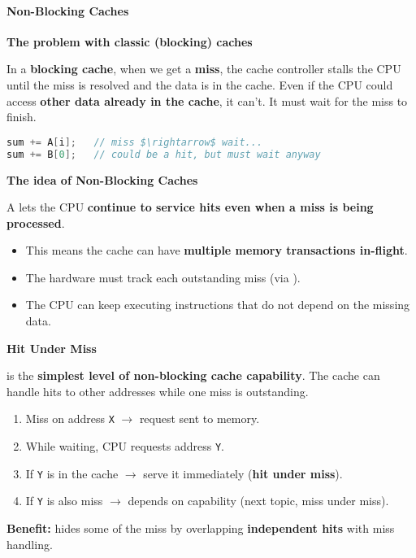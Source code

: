\paragraph{Non-Blocking Caches}\label{paragraph: Non-Blocking Caches}

\begin{flushleft}
    \textcolor{Red2}{ \textbf{The problem with classic (blocking) caches}}
\end{flushleft}
In a \textbf{blocking cache}, when we get a \textbf{miss}, the cache controller stalls the CPU until the miss is resolved and the data is in the cache. Even if the CPU could access \textbf{other data already in the cache}, it can't. It must wait for the miss to finish.
\begin{lstlisting}[language=c, mathescape=true]
sum += A[i];   // miss $\rightarrow$ wait...
sum += B[0];   // could be a hit, but must wait anyway\end{lstlisting}

\highspace
\begin{flushleft}
    \textcolor{Green3}{ \textbf{The idea of Non-Blocking Caches}}
\end{flushleft}
A  lets the CPU \textbf{continue to service hits even when a miss is being processed}.
\begin{itemize}
    \item This means the cache can have \textbf{multiple memory transactions in-flight}.
    \item The hardware must track each outstanding miss (via ).
    \item The CPU can keep executing instructions that do not depend on the missing data.
\end{itemize}

\highspace
\begin{flushleft}
    \textcolor{Green3}{ \textbf{Hit Under Miss}}
\end{flushleft}
 is the \textbf{simplest level of non-blocking cache capability}. The cache can handle hits to other addresses while one miss is outstanding.
\begin{enumerate}
    \item Miss on address \texttt{X} $\rightarrow$ request sent to memory.
    \item While waiting, CPU requests address \texttt{Y}.
    \item If \texttt{Y} is in the cache $\rightarrow$ serve it immediately (\textbf{hit under miss}).
    \item If \texttt{Y} is also miss $\rightarrow$ depends on capability (next topic, miss under miss).
\end{enumerate}
\textcolor{Green3}{ \textbf{Benefit:}} hides some of the miss by overlapping \textbf{independent hits} with miss handling.

